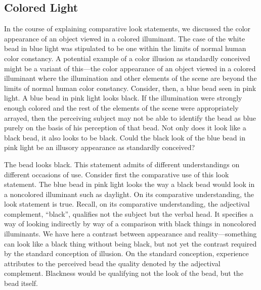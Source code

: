 \documentclass[12pt]{article}
\begin{document}
\subsection{Colored Light}\label{sub:colored_illuminants} %

In the course of explaining comparative look statements, we discussed the color appearance of an object viewed in a colored illuminant. The case of the white bead in blue light was stipulated to be one within the limits of normal human color constancy. A potential example of a color illusion as standardly conceived might be a variant of this---the color appearance of an object viewed in a colored illuminant where the illumination and other elements of the scene are beyond the limits of normal human color constancy. Consider, then, a blue bead seen in pink light. A blue bead in pink light looks black. If the illumination were strongly enough colored and the rest of the elements of the scene were appropriately arrayed, then the perceiving subject may not be able to identify the bead as blue purely on the basis of his perception of that bead. Not only does it look like a black bead, it also looks to be black. Could the black look of the blue bead in pink light be an illusory appearance as standardly conceived? 


The bead looks black. This statement admits of different understandings on different occasions of use. Consider first the comparative use of this look statement. The blue bead in pink light looks the way a black bead would look in a noncolored illuminant such as daylight. On its comparative understanding, the look statement is true. Recall, on its comparative understanding, the adjectival complement, ``black'', qualifies not the subject but the verbal head. It specifies a way of looking indirectly by way of a comparison with black things in noncolored illuminants. We have here a contrast between appearance and reality---something can look like a black thing without being black, but not yet the contrast required by the standard conception of illusion. On the standard conception, experience attributes to the perceived bead the quality denoted by the adjectival complement. Blackness would be qualifying not the look of the bead, but the bead itself. 
\end{document}
